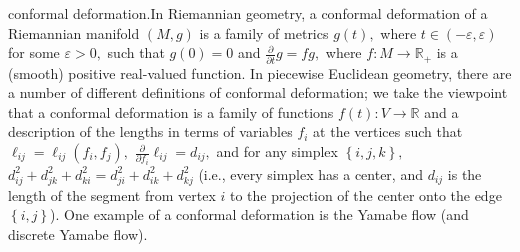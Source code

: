 \documentclass{article}%
\begin{document}
conformal deformation.\qquad In Riemannian geometry, a conformal deformation
of a Riemannian manifold $\left(  M,g\right)  $ is a family of metrics
$g\left(  t\right)  ,$ where $t\in\left(  -\varepsilon,\varepsilon\right)  $
for some $\varepsilon>0,$ such that $g\left(  0\right)  =0$ and $\frac
{\partial}{\partial t}g=fg,$ where $f:M\rightarrow\mathbb{R}_{+}$ is a
(smooth) positive real-valued function. In piecewise Euclidean geometry, there
are a number of different definitions of conformal deformation; we take the
viewpoint that a conformal deformation is a family of functions $f\left(
t\right)  :V\rightarrow\mathbb{R}$ and a description of the lengths in terms
of variables $f_{i}$ at the vertices such that $\ell_{ij}=\ell_{ij}\left(
f_{i},f_{j}\right)  ,$ $\frac{\partial}{\partial f_{i}}\ell_{ij}=d_{ij},$ and
for any simplex $\left\{  i,j,k\right\}  ,$ $d_{ij}^{2}+d_{jk}^{2}+d_{ki}%
^{2}=d_{ji}^{2}+d_{ik}^{2}+d_{kj}^{2}$ (i.e., every simplex has a center, and
$d_{ij}$ is the length of the segment from vertex $i$ to the projection of the
center onto the edge $\left\{  i,j\right\}  $). One example of a conformal
deformation is the Yamabe flow (and discrete Yamabe flow).
\end{document}

